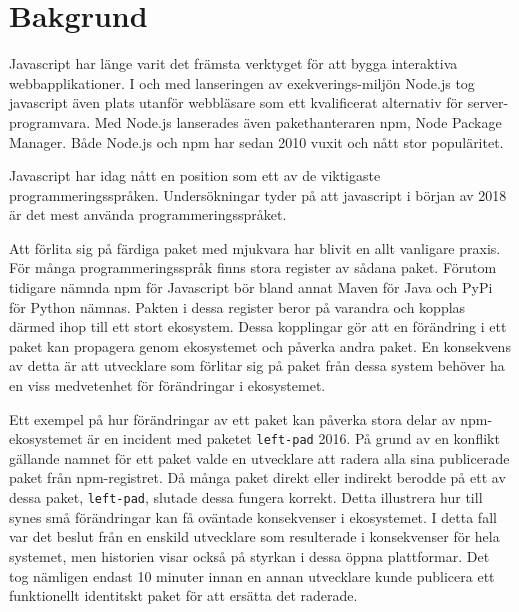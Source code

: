 \section{Bakgrund}
\label{sec:joel_o-background}
Javascript har länge varit det främsta verktyget för att bygga interaktiva webbapplikationer. I och med lanseringen av exekverings-miljön Node.js tog javascript även plats utanför webbläsare som ett kvalificerat alternativ för server-programvara. Med Node.js lanserades även pakethanteraren npm, Node Package Manager. Både Node.js och npm har sedan 2010 vuxit och nått stor populäritet. \cite{node-timeline}

Javascript har idag nått en position som ett av de viktigaste programmeringsspråken. Undersökningar tyder på att javascript i början av 2018 är det mest använda programmeringsspråket.\cite{githut}\cite{so-survey}

Att förlita sig på färdiga paket med mjukvara har blivit en allt vanligare praxis. För många programmeringsspråk finns stora register av sådana paket. Förutom tidigare nämnda npm för Javascript bör bland annat Maven för Java och PyPi för Python nämnas. Pakten i dessa register beror på varandra och kopplas därmed ihop till ett stort ekosystem. Dessa kopplingar gör att en förändring i ett paket kan propagera genom ekosystemet och påverka andra paket. En konsekvens av detta är att utvecklare som förlitar sig på paket från dessa system behöver ha en viss medvetenhet för förändringar i ekosystemet.\cite{Henry2017}

Ett exempel på hur förändringar av ett paket kan påverka stora delar av npm-ekosystemet är en incident med paketet \texttt{left-pad} 2016. På grund av en konflikt gällande namnet för ett paket valde en utvecklare att radera alla sina publicerade paket från npm-registret. Då många paket direkt eller indirekt berodde på ett av dessa paket,  \texttt{left-pad}, slutade dessa fungera korrekt. Detta illustrera hur till synes små förändringar kan få oväntade konsekvenser i ekosystemet. I detta fall var det beslut från en enskild utvecklare som resulterade i konsekvenser för hela systemet, men historien visar också på styrkan i dessa öppna plattformar. Det tog nämligen endast 10 minuter innan en annan utvecklare kunde publicera ett funktionellt identitskt paket för att ersätta det raderade.\cite{npm-left-pad}

